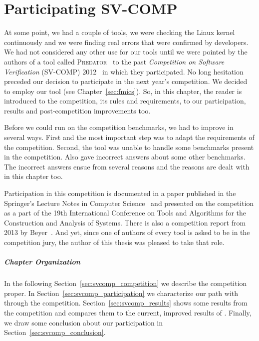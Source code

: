 
\chapter{Participating SV-COMP}\label{sec:svcomp}
At some point, we had a couple of tools, we were checking the Linux kernel
continuously and we were finding real errors that were confirmed by
developers. We had not considered any other use for our tools until we were
pointed by the authors of a tool called \textsc{Predator}~\cite{predator} to
the past \emph{Competition on Software Verification} (SV-COMP)
2012~\cite{sv-comp12} in which they participated. No long hesitation preceded
our decision to participate in the next year's competition. We decided to
employ our tool \symbio (see Chapter~\ref{sec:fmics}). So, in this chapter,
the reader is introduced to the competition, its rules and requirements,
to our participation, results and post-competition improvements too.

Before we could run \symbio on the competition benchmarks, we had to improve
\symbio in several ways. First and the most important step was to adapt the
requirements of the competition. Second, the tool was unable to handle some
benchmarks present in the competition. Also \symbio gave incorrect answers
about some other benchmarks. The incorrect answers ensue from several reasons
and the reasons are dealt with in this chapter too.

Participation in this competition is documented in a paper published in the
Springer's Lecture Notes in Computer Science~\cite{symbiotic-svcomp} and
presented on the competition as a part of the 19th International Conference on
Tools and Algorithms for the Construction and Analysis of Systems. There is
also a competition report from 2013 by Beyer~\cite{sv-comp13}.  And yet, since
one of authors of every tool is asked to be in the competition jury, the
author of this thesis was pleased to take that role.

\paragraph{Chapter Organization} In the following
Section~\ref{sec:svcomp_competition} we describe the competition proper. In
Section~\ref{sec:svcomp_participation} we characterize our path with \symbio
through the competition. Section~\ref{sec:svcomp_results} shows some results
from the competition and compares them to the current, improved results of
\symbio.  Finally, we draw some conclusion about our participation in
Section~\ref{sec:svcomp_conclusion}.

